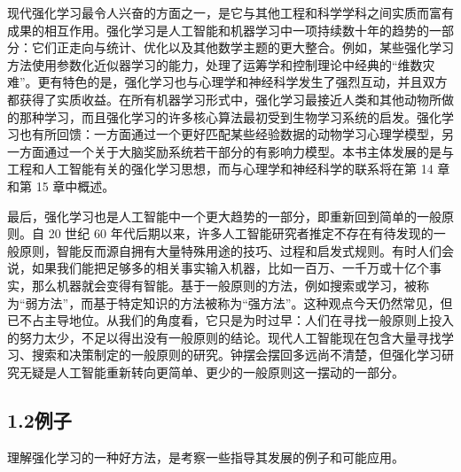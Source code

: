 \documentclass[UTF8, 12pt, fontset=fandol, oneside]{ctexart}
\begin{document}
现代强化学习最令人兴奋的方面之一，是它与其他工程和科学学科之间实质而富有成果的相互作用。强化学习是人工智能和机器学习中一项持续数十年的趋势的一部分：它们正走向与统计、优化以及其他数学主题的更大整合。例如，某些强化学习方法使用参数化近似器学习的能力，处理了运筹学和控制理论中经典的“维数灾难”。更有特色的是，强化学习也与心理学和神经科学发生了强烈互动，并且双方都获得了实质收益。在所有机器学习形式中，强化学习最接近人类和其他动物所做的那种学习，而且强化学习的许多核心算法最初受到生物学习系统的启发。强化学习也有所回馈：一方面通过一个更好匹配某些经验数据的动物学习心理学模型，另一方面通过一个关于大脑奖励系统若干部分的有影响力模型。本书主体发展的是与工程和人工智能有关的强化学习思想，而与心理学和神经科学的联系将在第 14 章和第 15 章中概述。

最后，强化学习也是人工智能中一个更大趋势的一部分，即重新回到简单的一般原则。自 20 世纪 60 年代后期以来，许多人工智能研究者推定不存在有待发现的一般原则，智能反而源自拥有大量特殊用途的技巧、过程和启发式规则。有时人们会说，如果我们能把足够多的相关事实输入机器，比如一百万、一千万或十亿个事实，那么机器就会变得有智能。基于一般原则的方法，例如搜索或学习，被称为“弱方法”，而基于特定知识的方法被称为“强方法”。这种观点今天仍然常见，但已不占主导地位。从我们的角度看，它只是为时过早：人们在寻找一般原则上投入的努力太少，不足以得出没有一般原则的结论。现代人工智能现在包含大量寻找学习、搜索和决策制定的一般原则的研究。钟摆会摆回多远尚不清楚，但强化学习研究无疑是人工智能重新转向更简单、更少的一般原则这一摆动的一部分。

\subsection*{1.2\quad 例子}

理解强化学习的一种好方法，是考察一些指导其发展的例子和可能应用。
\end{document}
